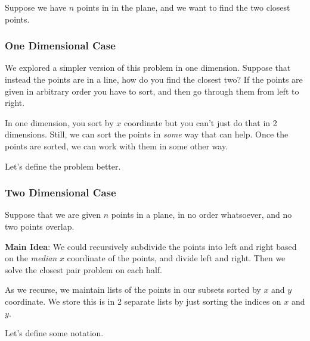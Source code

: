 \documentclass[12pt]{article}
\begin{document}
  Suppose we have $n$ points in in the plane, and we want to find the two closest
  points.

  \subsubsection{One Dimensional Case}
  We explored a simpler version of this problem in one dimension. Suppose that
  instead the points are in a line, how do you find the closest two? If the points
  are given in arbitrary order you have to sort, and then go through them from
  left to right.

  In one dimension, you sort by $x$ coordinate but you can't just do that in 2
  dimensions. Still, we can sort the points in {\it some} way that can help. Once
  the points are sorted, we can work with them in some other way.

  Let's define the problem better.

  \subsubsection{Two Dimensional Case}

  Suppose that we are given $n$ points in a plane, in no order whatsoever, and
  no two points overlap.


  {\bf Main Idea}: We could recursively subdivide the points into left and right
  based on the {\it median} $x$ coordinate of the points, and divide left and
  right. Then we solve the closest pair problem on each half. 


  As we recurse, we maintain lists of the points in our subsets sorted by $x$ and
  $y$ coordinate. We store this is in 2 separate lists by just sorting the indices
  on $x$ and $y$.

  Let's define some notation.
\end{document}
